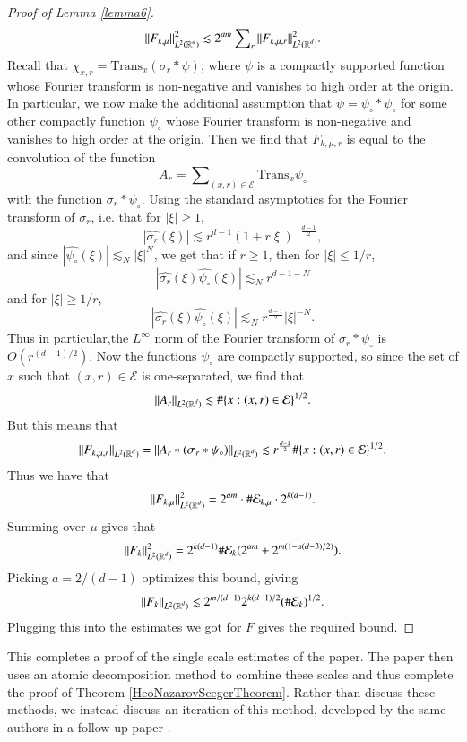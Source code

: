 \begin{proof}[Proof of Lemma \ref{lemma6}]
    \[ \| F_{k,\mu} \|_{L^2(\operatorname{\mathbb{R}}^d)}^2 \lesssim 2^{am} \sum\nolimits_r \| F_{k,\mu,r} \|_{L^2(\operatorname{\mathbb{R}}^d)}^2. \]
    Recall that $\chi_{x,r} = \text{Trans}_x(\sigma_r * \psi)$, where $\psi$ is a compactly supported function whose Fourier transform is non-negative and vanishes to high order at the origin. In particular, we now make the additional assumption that $\psi = \psi_{\circ} * \psi_{\circ}$ for some other compactly function $\psi_{\circ}$ whose Fourier transform is non-negative and vanishes to high order at the origin. Then we find that $F_{k,\mu,r}$ is equal to the convolution of the function
    \[ A_r = \sum\nolimits_{(x,r) \in \mathcal{E}} \text{Trans}_x \psi_{\circ} \]
    with the function $\sigma_r * \psi_{\circ}$. Using the standard asymptotics for the Fourier transform of $\sigma_r$, i.e. that for $|\xi| \geq 1$,
    \[ |\widehat{\sigma_r}(\xi)| \lesssim r^{d-1} (1 + r |\xi|)^{- \frac{d-1}{2}}, \]
    and since $|\widehat{\psi_\circ}(\xi)| \lesssim_N |\xi|^N$, we get that if $r \geq 1$, then for $|\xi| \leq 1/r$,
    \[ |\widehat{\sigma_r}(\xi) \widehat{\psi_\circ}(\xi)| \lesssim_N r^{d-1-N} \]
    and for $|\xi| \geq 1/r$,
    \[ |\widehat{\sigma_r}(\xi) \widehat{\psi_\circ}(\xi)| \lesssim_N r^{\frac{d-1}{2}} |\xi|^{-N}. \]
    Thus in particular,the $L^\infty$ norm of the Fourier transform of $\sigma_r * \psi_\circ$ is $O(r^{(d-1)/2})$. Now the functions $\psi_{\circ}$ are compactly supported, so since the set of $x$ such that $(x,r) \in \mathcal{E}$ is one-separated, we find that
    \[ \| A_r \|_{L^2(\operatorname{\mathbb{R}}^d)} \lesssim \# \{ x : (x,r) \in \mathcal{E} \}^{1/2}. \]
    But this means that
    \[ \| F_{k,\mu,r} \|_{L^2(\operatorname{\mathbb{R}}^d)} = \| A_r * (\sigma_r * \psi_{\circ}) \|_{L^2(\operatorname{\mathbb{R}}^d)} \lesssim r^{\frac{d-1}{2}} \# \{ x : (x,r) \in \mathcal{E} \}^{1/2}. \]
    Thus we have that
    \[ \| F_{k,\mu} \|_{L^2(\operatorname{\mathbb{R}}^d)}^2 = 2^{am} \cdot \# \mathcal{E}_{k,\mu} \cdot 2^{k(d-1)}. \]
    Summing over $\mu$ gives that
    \[ \| F_k \|_{L^2(\operatorname{\mathbb{R}}^d)}^2 = 2^{k(d-1)} \# \mathcal{E}_k (2^{am}  + 2^{m(1 - a(d-3)/2)}). \]
    Picking $a = 2/(d-1)$ optimizes this bound, giving
    \[ \| F_k \|_{L^2(\operatorname{\mathbb{R}}^d)} \lesssim 2^{m/(d-1)} 2^{k(d-1)/2} (\# \mathcal{E}_k)^{1/2}. \]
    Plugging this into the estimates we got for $F$ gives the required bound.
\end{proof}

This completes a proof of the single scale estimates of the paper. The paper then uses an atomic decomposition method to combine these scales and thus complete the proof of Theorem \ref{HeoNazarovSeegerTheorem}. Rather than discuss these methods, we instead discuss an iteration of this method, developed by the same authors in a follow up paper \cite{HeoandNazarovandSeeger2}.

